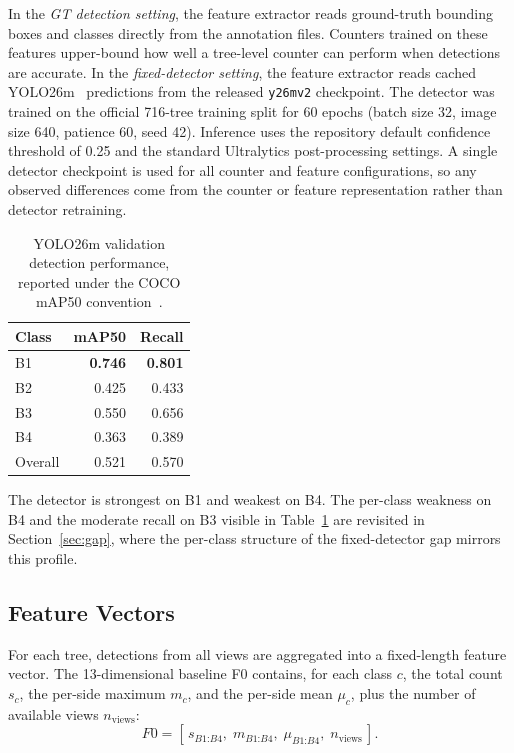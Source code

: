 \documentclass[conference]{IEEEtran}
\begin{document}
In the \textit{GT detection setting}, the feature extractor reads ground-truth
bounding boxes and classes directly from the annotation files. Counters trained
on these features upper-bound how well a tree-level counter can perform when
detections are accurate. In the \textit{fixed-detector setting}, the feature
extractor reads cached YOLO26m~\cite{ref15} predictions from the released
\texttt{y26mv2} checkpoint. The detector was trained on the official 716-tree training
split for 60 epochs (batch size 32, image size 640, patience 60, seed 42).
Inference uses the repository default confidence threshold of 0.25 and the
standard Ultralytics post-processing settings. A single detector checkpoint is
used for all counter and feature configurations, so any observed differences
come from the counter or feature representation rather than detector retraining.

\begin{table}[!htbp]
  \centering
  \footnotesize
  \setlength{\tabcolsep}{4pt}
  \caption{YOLO26m validation detection performance, reported under the
    COCO mAP50 convention~\cite{ref16}.}
  \label{tab:yolo}
  \begin{tabular}{@{}lrr@{}}
    \toprule
    Class   & mAP50          & Recall         \\
    \midrule
    B1      & \textbf{0.746} & \textbf{0.801} \\
    B2      & 0.425          & 0.433          \\
    B3      & 0.550          & 0.656          \\
    B4      & 0.363          & 0.389          \\
    Overall & 0.521          & 0.570          \\
    \bottomrule
  \end{tabular}
\end{table}

The detector is strongest on B1 and weakest on B4. The per-class weakness on
B4 and the moderate recall on B3 visible in Table~\ref{tab:yolo} are revisited
in Section~\ref{sec:gap}, where the per-class structure of the fixed-detector
gap mirrors this profile.

\subsection{Feature Vectors}

For each tree, detections from all views are aggregated into a fixed-length
feature vector. The 13-dimensional baseline F0 contains, for each class $c$,
the total count $s_c$, the per-side maximum $m_c$, and the per-side mean
$\mu_c$, plus the number of available views $n_{\text{views}}$:
\begin{equation}
  F0 = [\,s_{B1\text{:}B4},\;m_{B1\text{:}B4},\;\mu_{B1\text{:}B4},\;
        n_{\text{views}}\,].
\end{equation}
\end{document}
